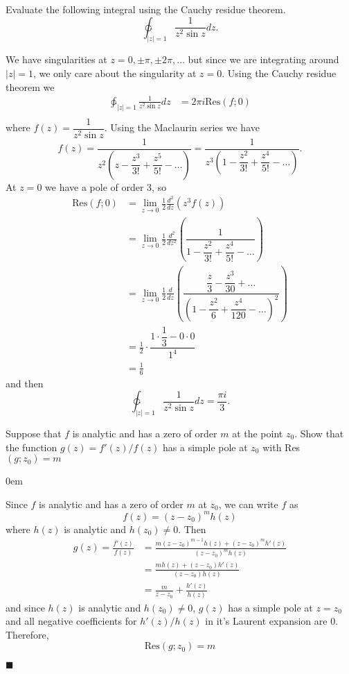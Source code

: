 \documentclass[12pt]{article}
\author{Warren Atkison}
\date{\today}
\renewcommand{\qed}{\hfill$\blacksquare$}
\renewenvironment{proof}{\vspace{1em}\begin{addmargin}[2em]{0em}\begin{newproof}}{\end{newproof}\end{addmargin}\qed}
\newenvironment{exercise}[2][Exercise]{\begin{trivlist}
\item[\hskip \labelsep {\bfseries #1} \hskip \labelsep {\bfseries #2.}]}{\end{trivlist}}
\begin{document}
\fancyhf{}
\fancyhead[R]{\today}
\fancyfoot[R]{\thepage}

\begin{exercise}{3e}
	Evaluate the following integral using the Cauchy residue theorem.
	\[
		\ointctrclockwise_{|z| = 1} \frac{1}{z^2\sin z}dz.
	\]
\end{exercise}
We have singularities at $z = 0,\pm\pi,\pm2\pi,\ldots$ but since we are integrating around $|z| = 1$, we only care about the singularity at $z = 0$. Using the Cauchy residue theorem we 
\begin{align*}
	\ointctrclockwise_{|z| = 1} \frac{1}{z^2\sin z}dz &= 2\pi i\text{Res}(f;0) \\
\end{align*}
where $f(z) = \dfrac{1}{z^2\sin z}$. Using the Maclaurin series we have
\[
f(z) = \dfrac{1}{z^2\left(z - \dfrac{z^3}{3!} + \dfrac{z^5}{5!} - \ldots\right)} = \dfrac{1}{z^3\left(1 - \dfrac{z^2}{3!} + \dfrac{z^4}{5!} - \ldots\right)} .
\]
At $z = 0$ we have a pole of order 3, so
\begin{align*}
	\text{Res}(f;0) &= \lim_{z \to 0} \frac{1}{2} \frac{d^2}{dz}(z^3f(z)) \\
			&= \lim_{z \to 0} \frac{1}{2} \frac{d^2}{dz^2} \left(\dfrac{1}{1 - \dfrac{z^2}{3!} + \dfrac{z^4}{5!} - \ldots}\right) \\
			&= \lim_{z \to 0} \frac{1}{2} \frac{d}{dz}\left(\dfrac{\dfrac{z}{3} - \dfrac{z^3}{30} + \ldots}{\left(1 - \dfrac{z^2}{6} + \dfrac{z^4}{120} - \ldots\right)^{2}} \right) \\
			&= \frac{1}{2} \cdot \dfrac{1\cdot\dfrac{1}{3} - 0\cdot 0}{1^4} \\
			&= \frac{1}{6}
\end{align*}
and then
\[
	\ointctrclockwise_{|z|=1} \frac{1}{z^2\sin z}dz = \frac{\pi i}{3}.
\]
\begin{exercise}{6}
	Suppose that $f$ is analytic and has a zero of order $m$ at the point $z_0$. Show that the function $g(z) = f'(z)/f(z)$ has a simple pole at $z_0$ with Res$(g;z_0) = m$
\end{exercise}	
\begin{proof}
	Since $f$ is analytic and has a zero of order $m$ at $z_0$, we can write $f$ as
	\[
		f(z) = (z - z_0)^mh(z)
	\]
	where $h(z)$ is analytic and $h(z_0) \neq 0$. Then
	\begin{align*}
		g(z) = \frac{f'(z)}{f(z)} &= \frac{m(z - z_0)^{m-1}h(z) + (z - z_0)^mh'(z)}{(z - z_0)^mh(z)} \\
					  &= \frac{mh(z) + (z - z_0)h'(z)}{(z - z_0)h(z)} \\
					  &= \frac{m}{z - z_0} + \frac{h'(z)}{h(z)}
	\end{align*}
	and since $h(z)$ is analytic and $h(z_0) \neq 0$, $g(z)$ has a simple pole at $z = z_0$ and all negative coefficients for $h'(z)/h(z)$ in it's Laurent expansion are 0. Therefore,
	\[
		\text{Res}(g; z_0) = m
	\]
\end{proof}
\end{document}
